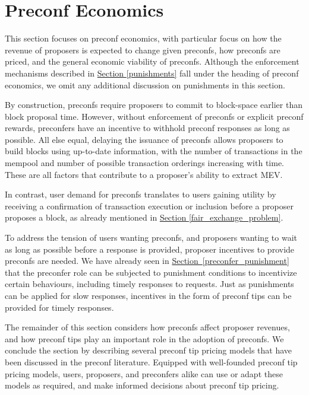 \documentclass[a4paper]{article}
\theoremstyle{boldstyle}
\begin{document}
\section{Preconf Economics}
\label{preconf_economics}

This section focuses on preconf economics, with particular focus on how the revenue of proposers is expected to change given preconfs, how preconfs are priced, and the general economic viability of preconfs. Although the enforcement mechanisms described in \hyperref[punishments]{Section \ref{punishments}} fall under the heading of preconf economics, we omit any additional discussion on punishments in this section. 

By construction, preconfs require proposers to commit to block-space earlier than block proposal time. However, without enforcement of preconfs or explicit preconf rewards, preconfers have an incentive to withhold preconf responses as long as possible. All else equal, delaying the issuance of preconfs allows proposers to build blocks using up-to-date information, with the number of transactions in the mempool and number of possible transaction orderings increasing with time. These are all factors that contribute to a proposer's ability to extract MEV. 

In contrast, user demand for preconfs translates to users gaining utility by receiving a confirmation of transaction execution or inclusion before a proposer proposes a block, as already mentioned in \hyperref[fair_exchange_problem]{Section \ref{fair_exchange_problem}}.

To address the tension of users wanting preconfs, and proposers wanting to wait as long as possible before a response is provided, proposer incentives to provide preconfs are needed. We have already seen in \hyperref[preconfer_punishment]{Section~\ref{preconfer_punishment}} that the preconfer role can be subjected to punishment conditions to incentivize certain behaviours, including timely responses to requests. Just as punishments can be applied for slow responses, incentives in the form of preconf tips can be provided for timely responses. 

The remainder of this section considers how preconfs affect proposer revenues, and how preconf tips play an important role in the adoption of preconfs. We conclude the section by describing several preconf tip pricing models that have been discussed in the preconf literature. Equipped with well-founded preconf tip pricing models, users, proposers, and preconfers alike can use or adapt these models as required, and make informed decisions about preconf tip pricing.
\end{document}
